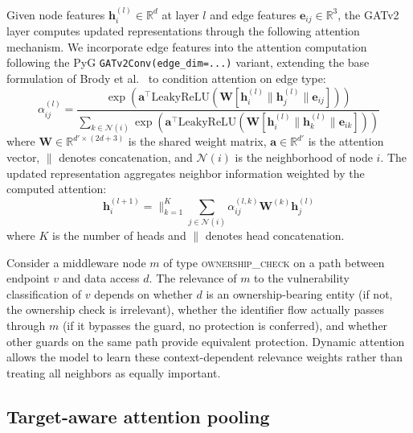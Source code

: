 Given node features $\mathbf{h}_i^{(l)} \in \mathbb{R}^d$ at layer $l$ and
edge features $\mathbf{e}_{ij} \in \mathbb{R}^3$, the GATv2 layer computes
updated representations through the following attention mechanism. We
incorporate edge features into the attention computation following the PyG
\texttt{GATv2Conv(edge\_dim=...)} variant, extending the base formulation
of Brody et al.\ \citep{brody2021attentive} to condition attention on edge
type:
\begin{equation}
\label{eq:det-gatv2}
\alpha_{ij}^{(l)} = \frac{
  \exp\!\left(\mathbf{a}^{\top}
  \mathrm{LeakyReLU}\!\left(\mathbf{W}\left[
  \mathbf{h}_i^{(l)} \| \mathbf{h}_j^{(l)} \| \mathbf{e}_{ij}
  \right]\right)\right)
}{
  \sum_{k \in \mathcal{N}(i)} \exp\!\left(\mathbf{a}^{\top}
  \mathrm{LeakyReLU}\!\left(\mathbf{W}\left[
  \mathbf{h}_i^{(l)} \| \mathbf{h}_k^{(l)} \| \mathbf{e}_{ik}
  \right]\right)\right)
}
\end{equation}
where $\mathbf{W} \in \mathbb{R}^{d' \times (2d + 3)}$ is the shared weight
matrix, $\mathbf{a} \in \mathbb{R}^{d'}$ is the attention vector, $\|$
denotes concatenation, and $\mathcal{N}(i)$ is the neighborhood of node $i$.
The updated representation aggregates neighbor information weighted by the
computed attention:
\begin{equation}
\label{eq:det-update}
\mathbf{h}_i^{(l+1)} = \Big\|_{k=1}^{K} \sum_{j \in \mathcal{N}(i)}
\alpha_{ij}^{(l,k)} \mathbf{W}^{(k)} \mathbf{h}_j^{(l)}
\end{equation}
where $K$ is the number of heads and $\|$ denotes head concatenation.

Consider a middleware node $m$ of type \textsc{ownership\_check} on a path
between endpoint $v$ and data access $d$. The relevance of $m$ to the
vulnerability classification of $v$ depends on whether $d$ is an
ownership-bearing entity (if not, the ownership check is irrelevant),
whether the identifier flow actually passes through $m$ (if it bypasses the
guard, no protection is conferred), and whether other guards on the same
path provide equivalent protection. Dynamic attention allows the model to
learn these context-dependent relevance weights rather than treating all
neighbors as equally important.

\subsection{Target-aware attention pooling}
\label{sec:det-pooling}

